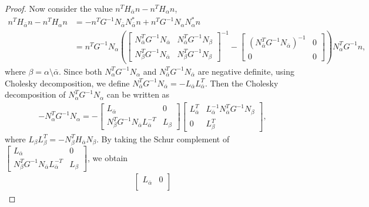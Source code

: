 \documentclass{article}
\begin{document}
\begin{proof}
		Now consider the value $n^{T}H_{\bar{\alpha}}n - n^{T}H_{\alpha}n$,
		\begin{align*}
			n^{T}H_{\bar{\alpha}}n - n^{T}H_{\alpha}n
			&= -n^{T}G^{-1}N_{\bar{\alpha}}N_{\bar{\alpha}}^{\ast}n
			+ n^{T}G^{-1}N_{\alpha}N_{\alpha}^{\ast}n\\
			&= n^{T}G^{-1}N_{\alpha}
			\left(
			\begin{bmatrix}
				N_{\bar{\alpha}}^{T}G^{-1}N_{\bar{\alpha}} & N_{\bar{\alpha}}^{T}G^{-1}N_{\beta}\\
				N_{\beta}^{T}G^{-1}N_{\bar{\alpha}} & N_{\beta}^{T}G^{-1}N_{\beta}
			\end{bmatrix}^{-1}
			- 
			\begin{bmatrix}
				(N_{\bar{\alpha}}^{T}G^{-1}N_{\bar{\alpha}})^{-1} & 0\\
				0 & 0
			\end{bmatrix}
			\right)
			N_{\alpha}^{T}G^{-1}n,
		\end{align*}
		where $\beta = \alpha \setminus \bar{\alpha}$.
		Since both $N_{\alpha}^{T}G^{-1}N_{\alpha}$ and
		$N_{\bar{\alpha}}^{T}G^{-1}N_{\bar{\alpha}}$ are negative definite, using Cholesky decomposition, we define $N_{\bar{\alpha}}^{T}G^{-1}N_{\bar{\alpha}} = -L_{\bar{\alpha}}L_{\bar{\alpha}}^{T}$. Then the Cholesky decomposition of $N_{\alpha}^{T}G^{-1}N_{\alpha}$ can be written as
		\begin{align*}
			-N_{\alpha}^{T}G^{-1}N_{\alpha} = -\begin{bmatrix}
				L_{\bar{\alpha}} & 0\\
				N_{\beta}^{T}G^{-1}N_{\bar{\alpha}}L_{\bar{\alpha}}^{-T} & L_{\beta}
			\end{bmatrix}\begin{bmatrix}
				L_{\bar{\alpha}}^{T} & L_{\bar{\alpha}}^{-1}N_{\bar{\alpha}}^{T}G^{-1}N_{\beta}\\
				0 & L_{\beta}^{T}
			\end{bmatrix},
		\end{align*}
		where $L_{\beta}L_{\beta}^{T} = -N_{\beta}^{T}H_{\bar{\alpha}}N_{\beta}$. By taking the Schur complement of $\begin{bmatrix}
			L_{\bar{\alpha}} & 0\\
			N_{\beta}^{T}G^{-1}N_{\bar{\alpha}}L_{\bar{\alpha}}^{-T} & L_{\beta}
		\end{bmatrix}$, we obtain
		\begin{align*}
			\begin{bmatrix}
				L_{\bar{\alpha}} & 0\\

\end{bmatrix}
\end{align*}
\end{proof}
\end{document}
